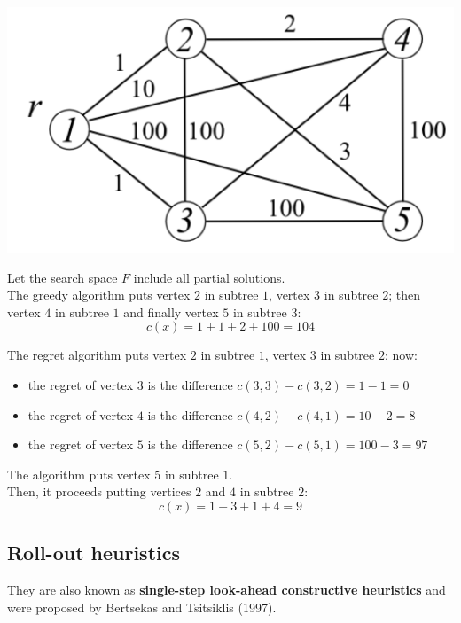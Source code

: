 \begin{center}
	\includegraphics[width=0.5\columnwidth]{img/RBCSMTP}
\end{center}

Let the search space $F$ include all partial solutions.\\

The greedy algorithm puts vertex $2$ in subtree $1$, vertex $3$ in subtree $2$; then vertex $4$ in subtree $1$ and finally vertex $5$ in subtree $3$:
$$ c(x) = 1 + 1 + 2 + 100 = 104$$ 

The regret algorithm puts vertex $2$ in subtree $1$, vertex $3$ in subtree $2$; now:
\begin{itemize}
	\item the regret of vertex $3$ is the difference $c(3, 3) − c(3, 2) = 1 − 1 = 0$
	\item the regret of vertex $4$ is the difference $c(4, 2) − c(4, 1) = 10 − 2 = 8$
	\item the regret of vertex $5$ is the difference $c(5, 2) − c(5, 1) = 100 − 3 = 97$
\end{itemize}
The algorithm puts vertex $5$ in subtree $1$.\\
Then, it proceeds putting vertices $2$ and $4$ in subtree $2$:
$$ c(x) = 1 + 3 + 1 + 4 = 9 $$

\newpage

\subsection{Roll-out heuristics}
They are also known as \textbf{single-step look-ahead constructive heuristics} and were proposed by Bertsekas and Tsitsiklis (1997).\\

